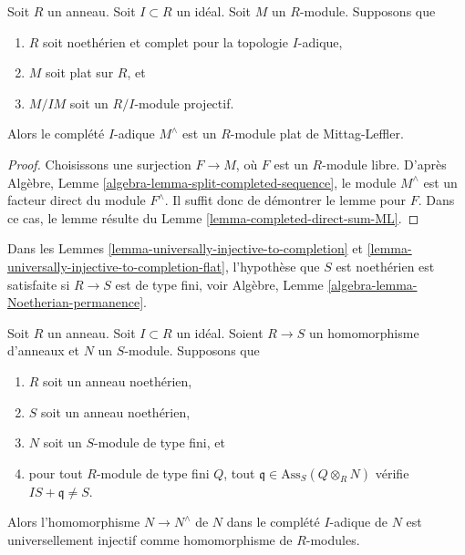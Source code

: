 \begin{lemma}
\label{lemma-lift-ML}
Soit $R$ un anneau. Soit $I \subset R$ un idéal.
Soit $M$ un $R$-module.
Supposons que
\begin{enumerate}
\item $R$ soit noethérien et complet pour la topologie $I$-adique,
\item $M$ soit plat sur $R$, et
\item $M/IM$ soit un $R/I$-module projectif.
\end{enumerate}
Alors le complété $I$-adique $M^\wedge$ est un
$R$-module plat de Mittag-Leffler.
\end{lemma}

\begin{proof}
Choisissons une surjection $F \to M$, où $F$ est un $R$-module libre. D'après
Algèbre, Lemme \ref{algebra-lemma-split-completed-sequence},
le module $M^\wedge$ est un facteur direct du module $F^\wedge$.
Il suffit donc de démontrer le lemme pour $F$.
Dans ce cas, le lemme résulte du
Lemme \ref{lemma-completed-direct-sum-ML}.
\end{proof}

\noindent
Dans les
Lemmes \ref{lemma-universally-injective-to-completion} et
\ref{lemma-universally-injective-to-completion-flat},
l'hypothèse que $S$ est noethérien est satisfaite si $R \to S$ est de type fini, voir
Algèbre, Lemme \ref{algebra-lemma-Noetherian-permanence}.

\begin{lemma}
\label{lemma-universally-injective-to-completion}
Soit $R$ un anneau.
Soit $I \subset R$ un idéal.
Soient $R \to S$ un homomorphisme d'anneaux et $N$ un $S$-module.
Supposons que
\begin{enumerate}
\item $R$ soit un anneau noethérien,
\item $S$ soit un anneau noethérien,
\item $N$ soit un $S$-module de type fini, et
\item pour tout $R$-module de type fini $Q$, tout
$\mathfrak q \in \text{Ass}_S(Q \otimes_R N)$
vérifie $IS + \mathfrak q \not = S$.
\end{enumerate}
Alors l'homomorphisme $N \to N^\wedge$ de $N$ dans le complété $I$-adique de $N$
est universellement injectif comme homomorphisme de $R$-modules.
\end{lemma}

